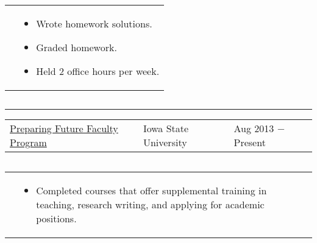 \documentclass{article}
\newcommand{\q}{$\quad$ \newline}
\newcommand{\vl}{4.25}
\newcommand{\wl}{8.4}
\newcommand{\ww}{13}
\newcommand{\myrule}{\noindent \rule{\textwidth}{1pt}}
\begin{document}
\noindent \begin{tabular}{@{}p{\vl cm}p{\ww cm}@{}}
& \begin{itemize}
\item Wrote homework solutions. 
\item Graded homework. 
\item Held 2 office hours per week.
\end{itemize}
\end{tabular} \q 






\myrule


\noindent \begin{tabular}{@{}p{\vl cm}p{\wl cm}l@{}}
\href{http://www.celt.iastate.edu/pff/}{Preparing Future Faculty Program} & Iowa State University & Aug 2013 $-$ Present
\end{tabular} \q 
 
\noindent \begin{tabular}{@{}p{\vl cm}p{\ww cm}@{}}
& \begin{itemize}
\item Completed courses that offer supplemental training in teaching, research writing, and applying for academic positions. 
\end{itemize}
\end{tabular} \q 
 
\end{document}
